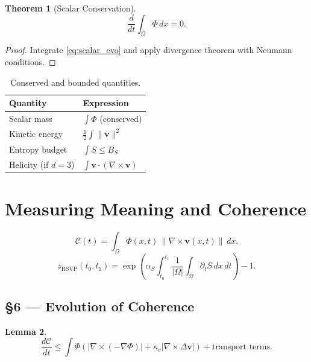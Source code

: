 \documentclass[11pt]{article}
\newtheorem{theorem}{Theorem}[section]
\newtheorem{lemma}[theorem]{Lemma}
\theoremstyle{definition}
\theoremstyle{remark}
\newcommand{\vect}[1]{\bm{#1}}
\begin{document}
\begin{theorem}[Scalar Conservation]
\[
\frac{d}{dt} \int_\Omega \Phi\,dx = 0.
\]
\end{theorem}

\begin{proof}
Integrate \eqref{eq:scalar_evo} and apply divergence theorem with Neumann conditions.
\end{proof}

\begin{table}[H]
\centering
\begin{tabular}{ll}
\toprule
Quantity & Expression \\
\midrule
Scalar mass & $\int \Phi$ (conserved) \\
Kinetic energy & $\frac{1}{2} \int \|\vect{v}\|^2$ \\
Entropy budget & $\int S \le B_S$ \\
Helicity (if $d=3$) & $\int \vect{v} \cdot (\nabla \times \vect{v})$ \\
\bottomrule
\end{tabular}
\caption{Conserved and bounded quantities.}
\end{table}

\section{Measuring Meaning and Coherence}
\begin{equation}
\boxed{\mathcal{C}(t)=\int_\Omega \Phi(x,t)\, \|\nabla\times \vect{v}(x,t)\|\,dx.}
\label{eq:coherence}
\end{equation}
\begin{equation}
\boxed{z_{\mathrm{RSVP}}(t_0,t_1) = \exp\left(\alpha_S \int_{t_0}^{t_1} \frac{1}{|\Omega|} \int_\Omega \partial_t S\,dx\,dt \right)-1.}
\label{eq:redshift}
\end{equation}

\subsection*{§6 — Evolution of Coherence}

\begin{lemma}
\[
\frac{d\mathcal{C}}{dt} \le \int \Phi \left( |\nabla \times (-\nabla \Phi)| + \kappa_v |\nabla \times \Delta \vect{v}| \right) + \text{transport terms}.
\]
\end{lemma}
\end{document}
